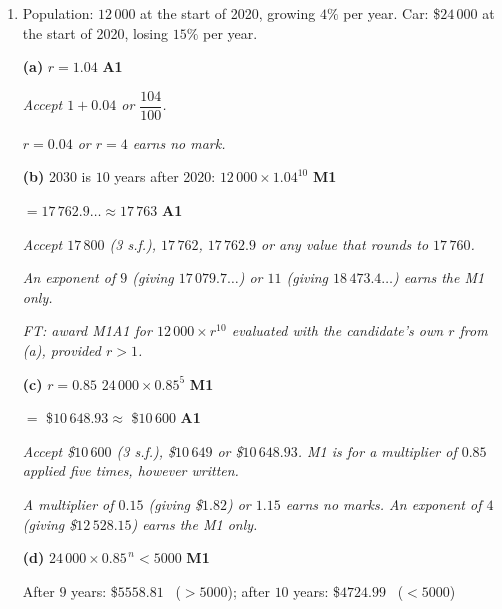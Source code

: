 \documentclass[12pt, twoside]{article}
\begin{document}
\begin{enumerate}[itemsep=0.3cm]
\emph{$n = 12.31\ldots$ is not an acceptable final answer --- $n$ must
be a whole number. Rounding it down to $n = 12$ earns the M1 only.}

\emph{FT: award A1 for the smallest integer $n$ correctly obtained
from the candidate's own expression in (b).}

\newpage

\item[2.] [Maximum mark: 7]

Population: $12\,000$ at the start of 2020, growing $4\%$ per
year. Car: \$$24\,000$ at the start of 2020, losing $15\%$ per year.

\medskip

\textbf{(a)} $r = 1.04$ \hfill \textbf{A1}

\emph{Accept $1 + 0.04$ or $\dfrac{104}{100}$.}

\emph{$r = 0.04$ or $r = 4$ earns no mark.}

\medskip

\textbf{(b)} 2030 is $10$ years after 2020:
$12\,000 \times 1.04^{10}$ \hfill \textbf{M1}

$= 17\,762.9\ldots \approx 17\,763$ \hfill \textbf{A1}

\emph{Accept $17\,800$ (3 s.f.), $17\,762$, $17\,762.9$ or any value
that rounds to $17\,760$.}

\emph{An exponent of $9$ (giving $17\,079.7\ldots$) or $11$ (giving
$18\,473.4\ldots$) earns the M1 only.}

\emph{FT: award M1A1 for $12\,000 \times r^{10}$ evaluated with the
candidate's own $r$ from (a), provided $r > 1$.}

\medskip

\textbf{(c)} $r = 0.85$ \qquad
$24\,000 \times 0.85^{5}$ \hfill \textbf{M1}

$=$ \$$10\,648.93 \approx$ \$$10\,600$ \hfill \textbf{A1}

\emph{Accept \$$10\,600$ (3 s.f.), \$$10\,649$ or \$$10\,648.93$. M1 is
for a multiplier of $0.85$ applied five times, however written.}

\emph{A multiplier of $0.15$ (giving \$$1.82$) or $1.15$ earns no
marks. An exponent of $4$ (giving \$$12\,528.15$) earns the M1 only.}

\medskip

\textbf{(d)} $24\,000 \times 0.85^{\,n} < 5000$ \hfill \textbf{M1}

After $9$ years: \$$5558.81$ \ ($> 5000$); \quad after $10$ years:
\$$4724.99$ \ ($< 5000$)


\end{enumerate}
\end{document}
